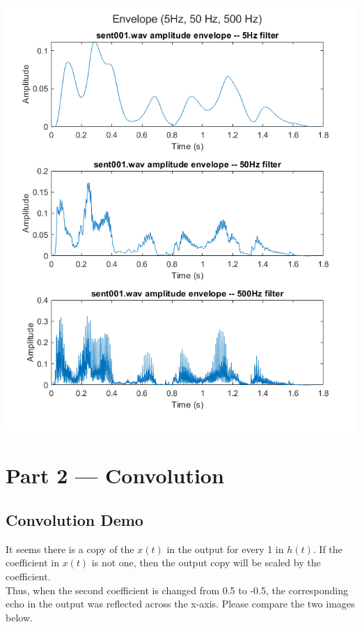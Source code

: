 \documentclass[11pt]{article}
\begin{document}
\includegraphics[width=\textwidth]{exercise4_5,50,500.png}


\pagebreak
\section{Part 2 --- Convolution}

\subsection{Convolution Demo}

It seems there is a copy of the $x(t)$ in the output for every 1 in $h(t)$.
If the coefficient in $x(t)$ is not one, then the output copy will be scaled by the coefficient.\\

Thus, when the second coefficient is changed from 0.5 to -0.5, the corresponding echo in the output was reflected across the x-axis.
Please compare the two images below.\\
\end{document}
